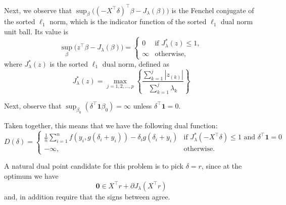 \documentclass[article]{jss}
\begin{document}
\begin{appendix}
  Next, we observe that \(\sup_\beta \big((-X^\intercal
  \delta)^\intercal \beta -  J_\lambda(\beta) \big)\) is the Fenchel conjugate of
  the sorted \(\ell_1\) norm, which is the indicator function of the sorted
  \(\ell_1\) dual norm unit ball. Its value is
  \[
    \sup_\beta \big(z^\intercal \beta -  J_\lambda(\beta) \big) =
    \begin{cases}
      0      & \text{if } J^*_\lambda(z) \leq 1, \\
      \infty & \text{otherwise},
    \end{cases}
  \]
  where \(J^*_\lambda(z)\) is the sorted \(\ell_1\) dual norm, defined as~\citep{negrinho2014}
  \begin{equation}
    J^*_\lambda(z) = \max_{j=1,2,\dots,p}\left\{ \frac{\sum_{k=1}^j|z_{(k)}|}{\sum_{k=1}^j\lambda_k}\right\}
  \end{equation}

  Next, observe that \(\sup_{\beta_0} (\delta^\intercal \bm{1} \beta_0) = \infty\) unless
  \(\delta^\intercal \bm{1} = 0\).

  Taken together, this means that we have the following dual function:
  \begin{equation}
    D(\delta) = \begin{cases}
      \frac{1}{n} \sum_{i=1}^n f\left(y_i, g(\delta_i+y_i)\right) - \delta_i g(\delta_i+ y_i) & \text{if } J^*_\lambda(-X^\intercal \delta) \leq 1 \text{ and } \delta^\intercal \bm{1} = 0 \\
      -\infty,                                                                                & \text{otherwise}.
    \end{cases}
  \end{equation}

  A natural dual point candidate for this problem is to pick
  \(\delta = r\), since
  at the optimum we have
  \[
    \bm{0} \in X^\intercal r + \partial J_\lambda(X^\intercal r)
  \]
  and, in addition require that the signs between agree.



\end{appendix}
\end{document}
